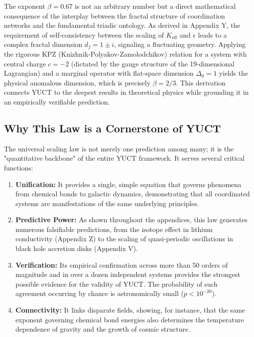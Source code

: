 \documentclass[11pt,a4paper]{article}
\begin{document}
The exponent \(\beta = 0.67\) is not an arbitrary number but a direct mathematical consequence of the interplay between the fractal structure of coordination networks and the fundamental triadic ontology. As derived in Appendix Y, the requirement of self-consistency between the scaling of \(K_{\mathrm{eff}}\) and \(\epsilon\) leads to a complex fractal dimension \(d_f = 1 \pm i\), signaling a fluctuating geometry. Applying the rigorous KPZ (Knizhnik-Polyakov-Zamolodchikov) relation for a system with central charge \(c = -2\) (dictated by the gauge structure of the 19-dimensional Lagrangian) and a marginal operator with flat-space dimension \(\Delta_0 = 1\) yields the physical anomalous dimension, which is precisely \(\beta = 2/3\). This derivation connects YUCT to the deepest results in theoretical physics while grounding it in an empirically verifiable prediction.

\subsection{Why This Law is a Cornerstone of YUCT}

The universal scaling law is not merely one prediction among many; it is the "quantitative backbone" of the entire YUCT framework. It serves several critical functions:

\begin{enumerate}
	\item \textbf{Unification:} It provides a single, simple equation that governs phenomena from chemical bonds to galactic dynamics, demonstrating that all coordinated systems are manifestations of the same underlying principles.
	\item \textbf{Predictive Power:} As shown throughout the appendices, this law generates numerous falsifiable predictions, from the isotope effect in lithium conductivity (Appendix Z) to the scaling of quasi-periodic oscillations in black hole accretion disks (Appendix V).
	\item \textbf{Verification:} Its empirical confirmation across more than 50 orders of magnitude and in over a dozen independent systems provides the strongest possible evidence for the validity of YUCT. The probability of such agreement occurring by chance is astronomically small (\(p < 10^{-20}\)).
	\item \textbf{Connectivity:} It links disparate fields, showing, for instance, that the same exponent governing chemical bond energies also determines the temperature dependence of gravity and the growth of cosmic structure.
\end{enumerate}
\end{document}
